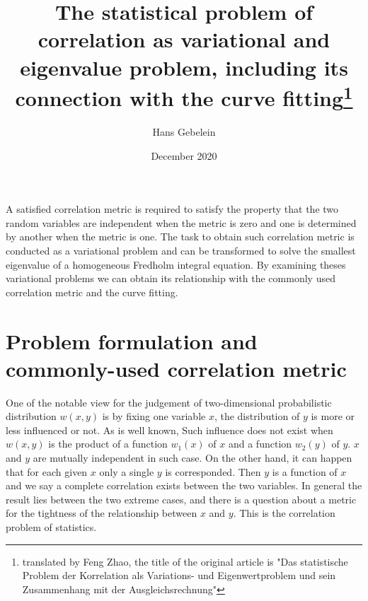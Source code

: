 \documentclass{article}
\title{The statistical problem of correlation as variational and eigenvalue problem, including its connection with the curve fitting\footnote{translated by Feng Zhao, the title of the original article is "Das statistische Problem der Korrelation als Variations- und Eigenwertproblem und sein Zusammenhang mit der Ausgleichsrechnung"}}
\date{December 2020}
\author{Hans Gebelein}
\begin{document}
\maketitle
\begin{centering}
A satisfied correlation metric is required to satisfy
the property that the two random variables are independent when the metric is zero and one is
determined by another when the metric is one.
The task to obtain such correlation metric is conducted
as a variational problem and can be transformed to solve
the smallest eigenvalue of a homogeneous Fredholm integral equation. By examining theses variational
problems we can obtain its relationship with the commonly used correlation metric and the curve fitting.
\end{centering}

\section{Problem formulation and commonly-used correlation metric}
One of the notable view for the judgement of two-dimensional probabilistic distribution $w(x,y)$ is by fixing one variable $x$, the distribution of $y$ is more or less influenced or not. As is well known,
Such influence does not exist when $w(x,y)$
is the product of a function $w_1(x)$ of $x$ and
a function $w_2(y)$ of $y$. $x$ and $y$
are mutually independent in such case. On the
other hand, it can happen that for each given $x$
only a single $y$ is corresponded. Then $y$
is a function of $x$ and we say a complete correlation
exists between the two variables. In general the result lies between the two extreme cases, and there is a question about a metric for the tightness of the relationship
between $x$ and $y$. This is the correlation problem of statistics.
\end{document}

